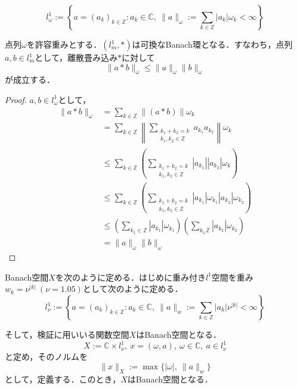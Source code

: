 \begin{thm}[重み付き$l^1$空間]
  \label{thm:重み付きl1空間}
  \begin{equation*}
    l_\omega^1 := \left\{ a = (a_k)_{k\in\mathbb{Z}}:a_k\in\mathbb{C},\ \|a\|_\omega:=\sum_{k\in\mathbb{Z}}|a_k|\omega_k < \infty\right\}
  \end{equation*}

  点列$\omega$を許容重みとする．$\left(l_m^1, *\right)$は可換なBanach環となる．すなわち，点列$a,b\in l^1_m$として，離散畳み込み$*$に対して
  \begin{equation*}
    \|a*b\|_\omega \leq \|a\|_\omega\|b\|_\omega
  \end{equation*}
  が成立する．
\end{thm}

\begin{proof}
  $a,b\in l_{\omega}^1$として，
  \begin{equation*}
    \begin{split}
      \|a*b\|_\omega &= \sum_{k\in\mathbb{Z}} \|(a*b)\|\omega_k \\
      &= \sum_{k\in\mathbb{Z}} \left\|\sum_{\substack{k_1+k_2=k \\ k_1,k_2\in\mathbb{Z}}}a_{k_1} a_{k_2}\right\| \omega_k \\
      &\leq \sum_{k\in\mathbb{Z}} \left(\sum_{\substack{k_1+k_2=k \\ k_1,k_2\in\mathbb{Z}}}|a_{k_1}||a_{k_2}|\omega_k\right)\\
      &\leq \sum_{k\in\mathbb{Z}} \left(\sum_{\substack{k_1+k_2=k \\ k_1,k_2\in\mathbb{Z}}}|a_{k_1}|\omega_{k_1}|a_{k_2}|\omega_{k_2}\right)\\
      &\leq \left(\sum_{k_1\in\mathbb{Z}}|a_{k_1}|\omega_{k_1}\right) \left(\sum_{k_\in\mathbb{Z}}|a_{k_2}|\omega_{k_2}\right) \\
      &= \|a\|_\omega\|b\|_\omega
    \end{split}
  \end{equation*}
\end{proof}

\begin{dfn}[Banach空間$X$]
  \label{dfn:Banach空間X-重み付きl1空間}
  Banach空間$X$を次のように定める．はじめに重み付き$l^1$空間を重み$w_k=\nu^{|k|}\ (\nu=1.05)$として次のように定める．
  \begin{equation*}
    l_{\nu}^1 := \left\{ a = (a_k)_{k\in\mathbb{Z}}:a_k\in\mathbb{C},\ \|a\|_{w} := \sum_{k\in\mathbb{Z}}|a_k|\nu^{|k|} < \infty\right\}
  \end{equation*}

  そして，検証に用いいる関数空間$X$はBanach空間となる．
  \begin{equation*}
    X:=\mathbb{C}\times l_{\nu}^1,\ x=(\omega,a),\ \omega \in \mathbb{C},\ a\in l_{\nu}^1
  \end{equation*}
  と定め，そのノルムを
  \begin{equation*}
    \|x\|_X:=\max \{|\omega|,\ \|a\|_w \}
  \end{equation*}
  として，定義する．このとき，$X$はBanach空間となる．
\end{dfn}

